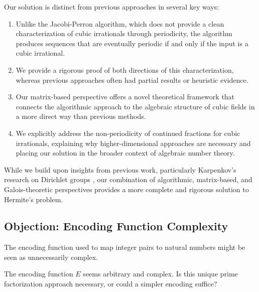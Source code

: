\begin{response}
Our solution is distinct from previous approaches in several key ways:
\begin{enumerate}
    \item Unlike the Jacobi-Perron algorithm, which does not provide a clean characterization of cubic irrationals through periodicity, the \HAPD{} algorithm produces sequences that are eventually periodic if and only if the input is a cubic irrational.
    
    \item We provide a rigorous proof of both directions of this characterization, whereas previous approaches often had partial results or heuristic evidence.
    
    \item Our matrix-based perspective offers a novel theoretical framework that connects the algorithmic approach to the algebraic structure of cubic fields in a more direct way than previous methods.
    
    \item We explicitly address the non-periodicity of continued fractions for cubic irrationals, explaining why higher-dimensional approaches are necessary and placing our solution in the broader context of algebraic number theory.
\end{enumerate}

While we build upon insights from previous work, particularly Karpenkov's research on Dirichlet groups \cite{Karpenkov2022}, our combination of algorithmic, matrix-based, and Galois-theoretic perspectives provides a more complete and rigorous solution to Hermite's problem.
\end{response}

\subsection{Objection: Encoding Function Complexity}

The encoding function used to map integer pairs to natural numbers might be seen as unnecessarily complex.

\begin{objection}
The encoding function $E$ seems arbitrary and complex. Is this unique prime factorization approach necessary, or could a simpler encoding suffice?
\end{objection}

